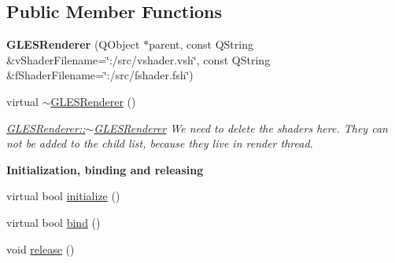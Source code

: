 \subsection*{Public Member Functions}
\begin{DoxyCompactItemize}
\item 
\mbox{\label{class_g_l_e_s_renderer_a0c5bf4702ee731dde0377a08b5e15ae2}} 
{\bfseries G\+L\+E\+S\+Renderer} (Q\+Object $\ast$parent, const Q\+String \&v\+Shader\+Filename=\char`\"{}\+:/src/vshader.\+vsh\char`\"{}, const Q\+String \&f\+Shader\+Filename=\char`\"{}\+:/src/fshader.\+fsh\char`\"{})
\item 
\mbox{\label{class_g_l_e_s_renderer_aa828ddb16aa0f76409d24369735baa63}} 
virtual \mbox{\hyperlink{class_g_l_e_s_renderer_aa828ddb16aa0f76409d24369735baa63}{$\sim$\+G\+L\+E\+S\+Renderer}} ()
\begin{DoxyCompactList}\small\item\em \mbox{\hyperlink{class_g_l_e_s_renderer_aa828ddb16aa0f76409d24369735baa63}{G\+L\+E\+S\+Renderer\+::$\sim$\+G\+L\+E\+S\+Renderer}} We need to delete the shaders here. They can not be added to the child list, because they live in render thread. \end{DoxyCompactList}\end{DoxyCompactItemize}
\begin{Indent}\textbf{ Initialization, binding and releasing}\par
\begin{DoxyCompactItemize}
\item 
virtual bool \mbox{\hyperlink{class_g_l_e_s_renderer_a0bb1617bc39236ccbf430cd282f127f2}{initialize}} ()
\item 
virtual bool \mbox{\hyperlink{class_g_l_e_s_renderer_a41d040c7fa439552abf339b3883b02f4}{bind}} ()
\item 
void \mbox{\hyperlink{class_g_l_e_s_renderer_a860d9102e98cd4394dc91c56e61c512b}{release}} ()
\end{DoxyCompactItemize}
\end{Indent}
